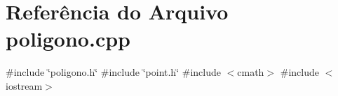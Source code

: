 \section{Referência do Arquivo poligono.\+cpp}
\label{poligono_8cpp}
{\ttfamily \#include \char`\"{}poligono.\+h\char`\"{}}\newline
{\ttfamily \#include \char`\"{}point.\+h\char`\"{}}\newline
{\ttfamily \#include $<$cmath$>$}\newline
{\ttfamily \#include $<$iostream$>$}\newline
